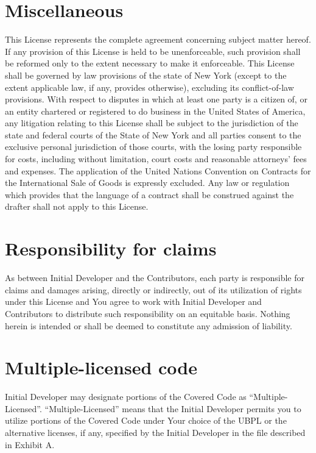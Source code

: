 \documentclass[letterpaper,colorlinks=true,linkcolor=blue]{book}
\begin{document}
\section{Miscellaneous}
This License represents the complete agreement concerning subject matter hereof. If any provision of this License is held to be unenforceable, such provision shall be reformed only to the extent necessary to make it enforceable. This License shall be governed by law provisions of the state of New York (except to the extent applicable law, if any, provides otherwise), excluding its conflict-of-law provisions. With respect to disputes in which at least one party is a citizen of, or an entity chartered or registered to do business in the United States of America, any litigation relating to this License shall be subject to the jurisdiction of the state and federal courts of the State of New York and all parties consent to the exclusive personal jurisdiction of those courts, with the losing party responsible for costs, including without limitation, court costs and reasonable attorneys' fees and expenses. The application of the United Nations Convention on Contracts for the International Sale of Goods is expressly excluded. Any law or regulation which provides that the language of a contract shall be construed against the drafter shall not apply to this License. 

\section{Responsibility for claims}
As between Initial Developer and the Contributors, each party is responsible for claims and damages arising, directly or indirectly, out of its utilization of rights under this License and You agree to work with Initial Developer and Contributors to distribute such responsibility on an equitable basis. Nothing herein is intended or shall be deemed to constitute any admission of liability. 

\section{Multiple-licensed code}
Initial Developer may designate portions of the Covered Code as ``Multiple-Licensed''. ``Multiple-Licensed'' means that the Initial Developer permits you to utilize portions of the Covered Code under Your choice of the UBPL or the alternative licenses, if any, specified by the Initial Developer in the file described in Exhibit A.  
\newpage
{}
\end{document}
